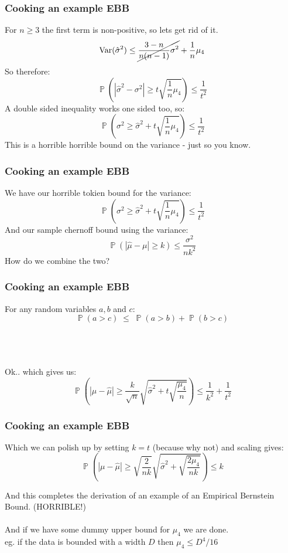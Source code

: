 \documentclass{beamer}
\DeclareMathOperator{\p}{\mathbb{P}}
\begin{document}
\begin{frame}
\frametitle{Cooking an example EBB}
For $n\ge 3$ the first term is non-positive, so lets get rid of it.
$$ \text{Var}(\hat{\sigma}^2) \le \cancel{\frac{3-n}{n(n-1)}\sigma^2} + \frac{1}{n}\mu_4$$
So therefore:
$$ \p\left(|\hat{\sigma}^2-\sigma^2|\ge t\sqrt{\frac{1}{n}\mu_4}\right)\le\frac{1}{t^2} $$
A double sided inequality works one sided too, so:
$$ \p\left(\sigma^2\ge \hat{\sigma}^2 + t\sqrt{\frac{1}{n}\mu_4}\right)\le\frac{1}{t^2} $$
This is a horrible horrible bound on the variance - just so you know.
\end{frame}

\begin{frame}
\frametitle{Cooking an example EBB}
We have our horrible tokien bound for the variance:
$$ \p\left(\sigma^2\ge \hat{\sigma}^2 + t\sqrt{\frac{1}{n}\mu_4}\right)\le\frac{1}{t^2} $$
And our sample chernoff bound using the variance:
$$ \p\left(|\hat{\mu}-\mu|\ge k\right)\le\frac{\sigma^2}{nk^2} $$
How do we combine the two?

\end{frame}

\begin{frame}
\frametitle{Cooking an example EBB}
\begin{lemma}\label{prob_union}
For any random variables $a,b$ and $c$:
\[\p(a>c) \; \le \; \p(a>b) + \p(b>c)\]
\end{lemma}
\-\hspace{1cm}\\
\-\hspace{1cm}\\
\-\hspace{1cm}\\
Ok.. which gives us:
$$ \p\left(|\mu-\hat{\mu}|\ge \frac{k}{\sqrt{n}}\sqrt{\hat{\sigma}^2 + t\sqrt{\frac{\mu_4}{n}}}\right)\le\frac{1}{k^2}+\frac{1}{t^2} $$
\end{frame}

\begin{frame}
\frametitle{Cooking an example EBB}
Which we can polish up by setting $k=t$ (because why not)
and scaling gives:
$$ \p\left(|\mu-\hat{\mu}|\ge \sqrt{\frac{2}{nk}}\sqrt{\hat{\sigma}^2 + \sqrt{\frac{2\mu_4}{nk}}}\right)\le k $$

And this completes the derivation of an example of an Empirical Bernstein Bound. (HORRIBLE!)\\
\-\hspace{1cm}\\


And if we have some dummy upper bound for $\mu_4$ we are done.\\
eg. if the data is bounded with a width $D$ then $\mu_4\le D^4/16$
\end{frame}
\end{document}
